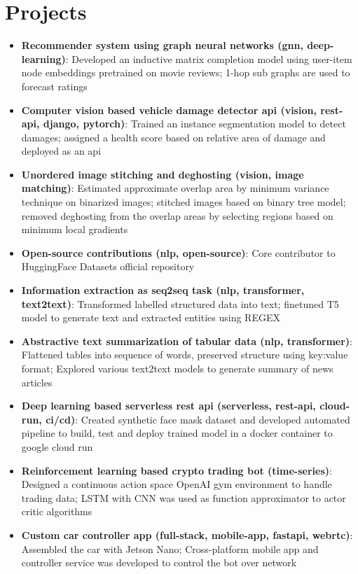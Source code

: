 \documentclass[a4paper,20pt]{article}
\newcommand{\resumeItem}[2]{
  \item\small{
    \textbf{#1}{: #2 \vspace{-2pt}}
  }
}
\newcommand{\resumeSubItem}[2]{\resumeItem{#1}{#2}\vspace{-3pt}}
\newcommand{\resumeSubHeadingListStart}{\begin{itemize}[leftmargin=*]}
\newcommand{\resumeSubHeadingListEnd}{\end{itemize}}
\begin{document}
\vspace{-5pt}

\section{Projects}
\resumeSubHeadingListStart
\resumeSubItem{Recommender system using graph neural networks (gnn, deep-learning)}{Developed an inductive matrix completion model using user-item node embeddings pretrained on movie reviews; 1-hop sub graphs are used to forecast ratings}
\vspace{2pt}
\resumeSubItem{Computer vision based vehicle damage detector api (vision, rest-api, django, pytorch)}{Trained an instance segmentation model to detect damages; assigned a health score based on relative area of damage and deployed as an api}
\vspace{2pt}
\resumeSubItem{Unordered image stitching and deghosting (vision, image matching)}{Estimated approximate overlap area by minimum variance technique on binarized images; stitched images based on binary tree model; removed deghosting from the overlap areas by selecting regions based on minimum local gradients}
\vspace{2pt}
\resumeSubItem{Open-source contributions (nlp, open-source)}{Core contributor to HuggingFace Datasets official repository}
\vspace{2pt}
\resumeSubItem{Information extraction as seq2seq task (nlp, transformer, text2text)}{Transformed labelled structured data into text; finetuned T5 model to generate text and extracted entities using REGEX}
\vspace{2pt}
\resumeSubItem{Abstractive text summarization of tabular data (nlp, transformer)}{Flattened tables into sequence of words, preserved structure using key:value format; Explored various text2text models to generate summary of news articles}
\vspace{2pt}
\resumeSubItem{Deep learning based serverless rest api (serverless, rest-api, cloud-run, ci/cd)}{Created synthetic face mask dataset and developed automated pipeline to build, test and deploy trained model in a docker container to google cloud run}
\vspace{2pt}
\resumeSubItem{Reinforcement learning based crypto trading bot (time-series)}{Designed a continuous action space OpenAI gym environment to handle trading data; LSTM with CNN was used as function approximator to actor critic algorithms}
\vspace{2pt}
\resumeSubItem{Custom car controller app (full-stack, mobile-app, fastapi, webrtc)}{Assembled the car with Jetson Nano; Cross-platform mobile app and controller service was developed to control the bot over network}
\resumeSubHeadingListEnd
\vspace{-5pt}
\end{document}
